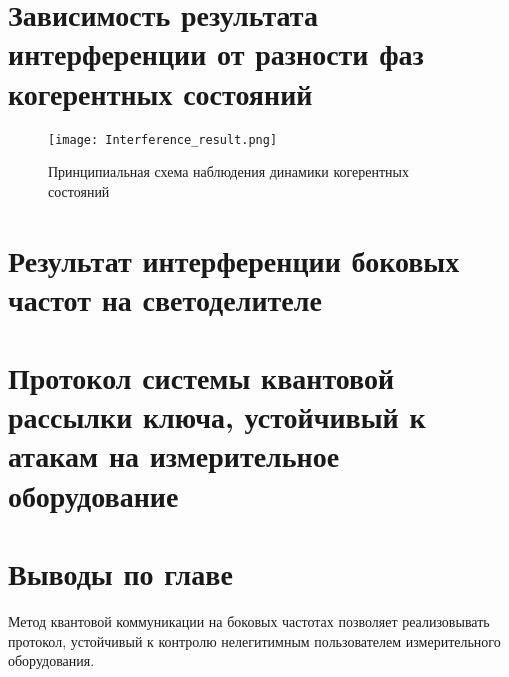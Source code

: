 \pagebreak

\section{Зависимость результата интерференции от разности фаз когерентных состояний} \label{ch:ch4/sect5}


\begin{figure}[ht]
 \centering
  \texttt{[image: Interference\_result.png]}
  \caption{Принципиальная схема наблюдения динамики когерентных состояний}
  \label{fig:Interference_result}
\end{figure}

\pagebreak

\section{Результат интерференции боковых частот на светоделителе} \label{ch:ch4/sect6}



\pagebreak

\section{Протокол системы квантовой рассылки ключа, устойчивый к атакам на измерительное оборудование} \label{ch:ch4/sect7}

\pagebreak

\section{Выводы по главе} \label{ch:ch4/sect8}


Метод квантовой коммуникации на боковых частотах позволяет реализовывать протокол, устойчивый к контролю нелегитимным пользователем измерительного оборудования. 
 
\pagebreak

